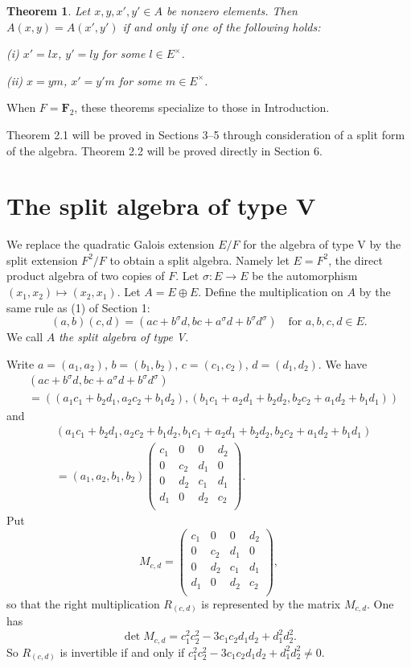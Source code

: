 \documentclass{article}
\newtheorem{thm}{Theorem}[section]
\newcommand{\bF}{\mathbf{F}}
\begin{document}
\begin{thm}
Let $x,y,x',y'\in A$ be nonzero elements.
Then  $A(x,y)=A(x',y')$ if and only if one of the following holds:


(i) 
$x'=l x$, $y'=ly$ for some $l\in E^{\times}$.


(ii) 
$x=ym$, $x'=y'm$ for some $m\in E^{\times}$.

\end{thm}

When $F=\bF_2$, these theorems specialize to those in Introduction.

Theorem 2.1 will be proved in Sections 3--5  through consideration of a split form of the algebra. Theorem 2.2 will be proved directly in Section 6.

\section{The split algebra of type V}


We replace the quadratic Galois extension $E/F$ for the algebra of type V by the split extension $F^2/F$ to obtain a split algebra.
Namely let $E=F^2$, the direct product algebra of two copies of $F$. 
Let $\sigma\colon E\to E$ be the automorphism $(x_1,x_2)\mapsto (x_2,x_1)$.
Let $A=E\oplus E$. Define the multiplication on $A$ by the same rule as (1) of Section 1:
$$
(a,b)(c,d)=(ac+b^{\sigma}d, bc+a^{\sigma}d+b^{\sigma}d^{\sigma})
\quad
\text{for $a,b,c,d\in E$.}
$$
We call $A$ {\it the split algebra of type V}.
 
Write $a=(a_1,a_2)$, $b=(b_1,b_2)$, $c=(c_1,c_2)$, $d=(d_1,d_2)$.
We have
\begin{align*}
&(ac+b^{\sigma}d, bc+a^{\sigma}d+b^{\sigma}d^{\sigma})\\
&=((a_1c_1+b_2d_1, a_2c_2+b_1d_2), (b_1c_1+a_2d_1+b_2d_2, b_2c_2+a_1d_2+b_1d_1))
\end{align*}
and
\begin{align*}
&(a_1c_1+b_2d_1, a_2c_2+b_1d_2, b_1c_1+a_2d_1+b_2d_2, b_2c_2+a_1d_2+b_1d_1)\\
&=(a_1,a_2, b_1,b_2)
\begin{pmatrix}
c_1 & 0 & 0 & d_2 \\
0 & c_2 & d_1 & 0 \\
0 & d_2 & c_1 & d_1 \\
d_1 & 0 & d_2 & c_2 \\
\end{pmatrix}.
\end{align*}
Put
$$
M_{c,d}=
\begin{pmatrix}
c_1 & 0 & 0 & d_2 \\
0 & c_2 & d_1 & 0 \\
0 & d_2 & c_1 & d_1 \\
d_1 & 0 & d_2 & c_2 \\
\end{pmatrix},
$$
so that the right multiplication $R_{(c,d)}$ is represented by the matrix
$M_{c,d}$.
One has
$$
\det M_{c,d}=c_1^2c_2^2-3c_1c_2d_1d_2+d_1^2d_2^2.
$$
So $R_{(c,d)}$ is invertible if and only if $c_1^2c_2^2-3c_1c_2d_1d_2+d_1^2d_2^2\ne 0$.
\end{document}
